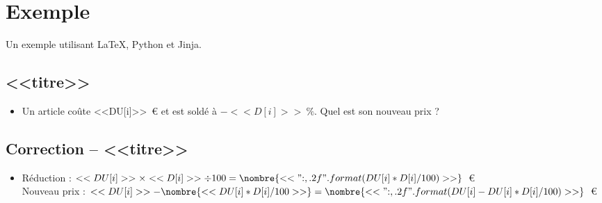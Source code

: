 \documentclass{article}
\begin{document}
\section{Exemple}
Un exemple utilisant \LaTeX, Python et Jinja.


\subsection{<<titre>>}
\begin{itemize}

  \item Un article coûte <<DU[i]>>~€ et est soldé à $-<<D[i]>>~\%$. Quel est son nouveau prix ?
\end{itemize}

\subsection{Correction -- <<titre>>}
\begin{itemize}

  \item Réduction : $<<DU[i]>>\times<<D[i]>>\div100=\nombre{<<"{:,.2f}".format(DU[i]*D[i]/100)>>}$~€\\
  Nouveau prix : $<<DU[i]>>-\nombre{<<DU[i]*D[i]/100>>}=\nombre{<<"{:,.2f}".format(DU[i]-DU[i]*D[i]/100)>>}$~€
\end{itemize}
\end{document}
